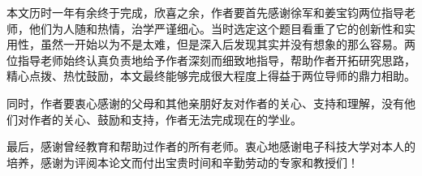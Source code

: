 
本文历时一年有余终于完成，欣喜之余，作者要首先感谢徐军和姜宝钧两位指导老师，他们为人随和热情，治学严谨细心。当时选定这个题目看重了它的创新性和实用性，虽然一开始以为不是太难，但是深入后发现其实并没有想象的那么容易。两位指导老师始终认真负责地给予作者深刻而细致地指导，帮助作者开拓研究思路，精心点拨、热忱鼓励，本文最终能够完成很大程度上得益于两位导师的鼎力相助。

同时，作者要衷心感谢的父母和其他亲朋好友对作者的关心、支持和理解，没有他们对作者的关心、鼓励和支持，作者无法完成现在的学业。

最后，感谢曾经教育和帮助过作者的所有老师。衷心地感谢电子科技大学对本人的培养，感谢为评阅本论文而付出宝贵时间和辛勤劳动的专家和教授们！